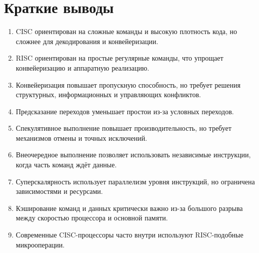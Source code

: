 \documentclass[12pt,a4paper]{article}
\begin{document}
\section{Краткие выводы}

\begin{enumerate}
    \item CISC ориентирован на сложные команды и высокую плотность кода, но сложнее для декодирования и конвейеризации.
    \item RISC ориентирован на простые регулярные команды, что упрощает конвейеризацию и аппаратную реализацию.
    \item Конвейеризация повышает пропускную способность, но требует решения структурных, информационных и управляющих конфликтов.
    \item Предсказание переходов уменьшает простои из-за условных переходов.
    \item Спекулятивное выполнение повышает производительность, но требует механизмов отмены и точных исключений.
    \item Внеочередное выполнение позволяет использовать независимые инструкции, когда часть команд ждёт данные.
    \item Суперскалярность использует параллелизм уровня инструкций, но ограничена зависимостями и ресурсами.
    \item Кэширование команд и данных критически важно из-за большого разрыва между скоростью процессора и основной памяти.
    \item Современные CISC-процессоры часто внутри используют RISC-подобные микрооперации.
\end{enumerate}
\end{document}
